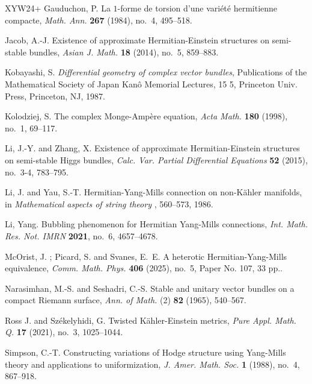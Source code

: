 \documentclass[12pt, reqno]{amsart}
\theoremstyle{plain}
\theoremstyle{definition}
\renewcommand{\>}{\rightarrow}
\renewcommand{\>}{\rightarrow}
\numberwithin{equation}{section} %
\begin{document}
\begin{thebibliography}{XYW24+}
    Gauduchon, P. La $1$-forme de torsion d'une vari\'et\'e{} hermitienne compacte, \emph{Math. Ann. }{\bf 267} (1984), no.~4, 495--518.




    Jacob, A.-J.     Existence of approximate Hermitian-Einstein structures on semi-stable bundles, \emph{Asian J. Math. }{\bf 18} (2014), no.~5, 859--883.

Kobayashi, S. {\it Differential geometry of complex vector bundles}, Publications of the Mathematical Society of Japan Kan\^o{} Memorial Lectures, 15 5, Princeton Univ. Press, Princeton, NJ, 1987.


Kolodziej, S. The complex Monge-Amp\`ere equation,\emph{ Acta Math.}
{\bf 180} (1998), no.~1, 69--117.





    Li, J.-Y. and Zhang, X.  Existence of approximate Hermitian-Einstein structures on semi-stable Higgs bundles, \emph{Calc. Var. Partial Differential Equations} {\bf 52} (2015), no.~3-4, 783--795.

    Li, J. and Yau, S.-T.  Hermitian-Yang-Mills connection on non-K\"ahler manifolds, in {\it Mathematical aspects of string theory }, 560--573, 1986.

         Li, Yang. Bubbling phenomenon for Hermitian Yang-Mills connections, \emph{Int. Math. Res. Not. IMRN} {\bf 2021}, no.~6, 4657--4678.






    McOrist, J. ;  Picard, S. and  Svanes,  E.~E. A heterotic Hermitian-Yang-Mills equivalence,\emph{ Comm. Math. Phys.} {\bf 406} (2025), no.~5, Paper No. 107, 33 pp..




    Narasimhan, M.-S.  and  Seshadri, C.-S.  Stable and unitary vector bundles on a compact Riemann surface,  \emph{Ann. of Math. }(2) {\bf 82} (1965), 540--567.

Ross J. and  Sz\'ekelyhidi, G. Twisted K\"ahler-Einstein metrics,
\emph{Pure Appl. Math. Q.} {\bf 17} (2021), no.~3, 1025--1044.

     Simpson, C.-T.  Constructing variations of Hodge structure using Yang-Mills theory and applications to uniformization, \emph{J. Amer. Math. Soc.} {\textbf 1} (1988), no.~4, 867--918.


\end{thebibliography}
\end{document}
